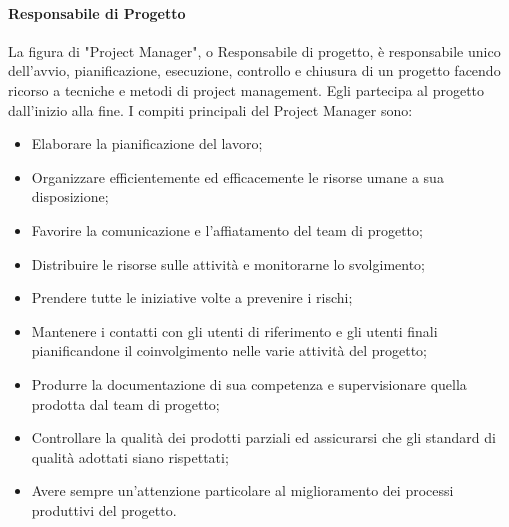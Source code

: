                 \paragraph{Responsabile di Progetto}
                    La figura di "Project Manager", o Responsabile di progetto, è responsabile unico dell'avvio, pianificazione, esecuzione, controllo e chiusura di un progetto facendo ricorso a tecniche e metodi  di project management. Egli partecipa al progetto dall'inizio alla fine.
                    \newline
                    I compiti principali del Project Manager sono:
                    \begin{itemize}
                        \item Elaborare la pianificazione del lavoro;
                        \item Organizzare efficientemente ed efficacemente le risorse umane a sua disposizione;
                        \item Favorire la comunicazione e l'affiatamento del team di progetto;
                        \item Distribuire le risorse sulle attività e monitorarne lo svolgimento;
                        \item Prendere tutte le iniziative volte a prevenire i rischi;
                        \item Mantenere i contatti con gli utenti di riferimento e gli utenti finali pianificandone il coinvolgimento nelle varie attività del progetto;
                        \item Produrre la documentazione di sua competenza e supervisionare quella prodotta dal team di progetto;
                        \item Controllare la qualità dei prodotti parziali ed assicurarsi che gli standard di qualità adottati siano rispettati;
                        \item Avere sempre un'attenzione particolare al miglioramento dei processi produttivi del progetto.
                    \end{itemize}

